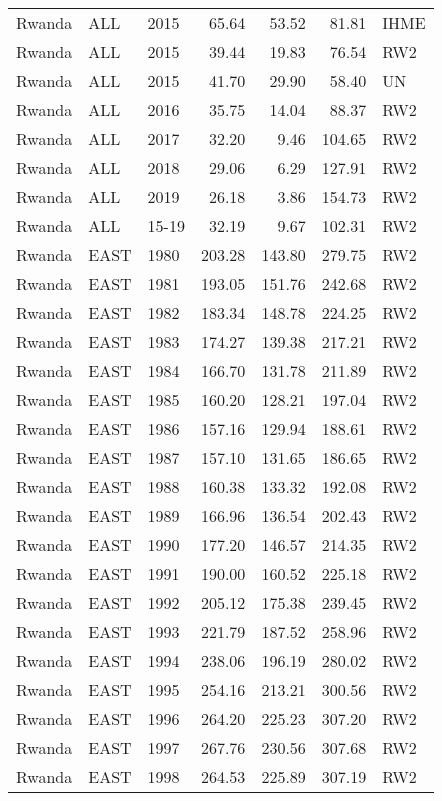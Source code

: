 \begin{longtable}{lllrrrl}
  Rwanda & ALL & 2015 & 65.64 & 53.52 & 81.81 & IHME \\ 
  Rwanda & ALL & 2015 & 39.44 & 19.83 & 76.54 & RW2 \\ 
  Rwanda & ALL & 2015 & 41.70 & 29.90 & 58.40 & UN \\ 
  Rwanda & ALL & 2016 & 35.75 & 14.04 & 88.37 & RW2 \\ 
  Rwanda & ALL & 2017 & 32.20 & 9.46 & 104.65 & RW2 \\ 
  Rwanda & ALL & 2018 & 29.06 & 6.29 & 127.91 & RW2 \\ 
  Rwanda & ALL & 2019 & 26.18 & 3.86 & 154.73 & RW2 \\ 
  Rwanda & ALL & 15-19 & 32.19 & 9.67 & 102.31 & RW2 \\ 
  Rwanda & EAST & 1980 & 203.28 & 143.80 & 279.75 & RW2 \\ 
  Rwanda & EAST & 1981 & 193.05 & 151.76 & 242.68 & RW2 \\ 
  Rwanda & EAST & 1982 & 183.34 & 148.78 & 224.25 & RW2 \\ 
  Rwanda & EAST & 1983 & 174.27 & 139.38 & 217.21 & RW2 \\ 
  Rwanda & EAST & 1984 & 166.70 & 131.78 & 211.89 & RW2 \\ 
  Rwanda & EAST & 1985 & 160.20 & 128.21 & 197.04 & RW2 \\ 
  Rwanda & EAST & 1986 & 157.16 & 129.94 & 188.61 & RW2 \\ 
  Rwanda & EAST & 1987 & 157.10 & 131.65 & 186.65 & RW2 \\ 
  Rwanda & EAST & 1988 & 160.38 & 133.32 & 192.08 & RW2 \\ 
  Rwanda & EAST & 1989 & 166.96 & 136.54 & 202.43 & RW2 \\ 
  Rwanda & EAST & 1990 & 177.20 & 146.57 & 214.35 & RW2 \\ 
  Rwanda & EAST & 1991 & 190.00 & 160.52 & 225.18 & RW2 \\ 
  Rwanda & EAST & 1992 & 205.12 & 175.38 & 239.45 & RW2 \\ 
  Rwanda & EAST & 1993 & 221.79 & 187.52 & 258.96 & RW2 \\ 
  Rwanda & EAST & 1994 & 238.06 & 196.19 & 280.02 & RW2 \\ 
  Rwanda & EAST & 1995 & 254.16 & 213.21 & 300.56 & RW2 \\ 
  Rwanda & EAST & 1996 & 264.20 & 225.23 & 307.20 & RW2 \\ 
  Rwanda & EAST & 1997 & 267.76 & 230.56 & 307.68 & RW2 \\ 
  Rwanda & EAST & 1998 & 264.53 & 225.89 & 307.19 & RW2 \\ 

\end{longtable}
